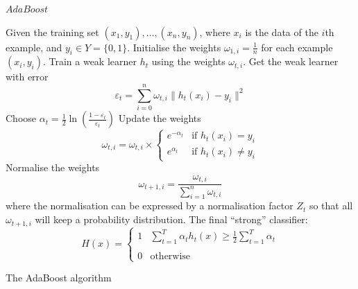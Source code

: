 \begin{table}
$AdaBoost$
\begin{algorithmic}[1]
\STATE Given the training set $(x_{1},y_{1}),\ldots,(x_{n},y_{n})$, where $x_{i}$ is the data of the $i$th example, and $y_{i} \in Y=\{0,1\}$.
\STATE Initialise the weights $\omega_{1,i}=\frac{1}{n}$ for each example $(x_{i},y_{i})$.
	\STATE Train a weak learner $h_{t}$ using the weights $\omega_{t,i}$.
	\STATE Get the weak learner with error 
                       \begin{equation}\label{eq:error}
                        \varepsilon_{t} =\sum_{i=0}^{n}\omega_{t,i}\|h_{t}(x_{i})-y_{i}\|^2
                       \end{equation}
	\STATE Choose $\alpha_{t}=\frac{1}{2}\ln \left( \frac{1-\varepsilon_{t}}{\varepsilon_{t}} \right)$
	\STATE Update the weights 
		\begin{equation}\label{eq:update}
		 \omega_{t,i} = \omega_{t,i} \times
                 \left\{
		  \begin{array}{ll}
		                                            e^{-\alpha_{t}} & \textrm{if $h_{t}(x_{i})=y_{i}$} \\
						           e^{\alpha_{t}} & \textrm{if $h_{t}(x_{i}) \neq y_{i}$}
		  \end{array}
		\right.
		\end{equation}
	\STATE Normalise the weights 
		\begin{equation}\label{eq:normalisation}
		  \omega_{t+1,i} = \frac{\omega_{t,i}}{\sum_{i=1}^{n}\omega_{t,i}}
		\end{equation}
	where the normalisation can be expressed by a normalisation factor $Z_{t}$ so that all $ \omega_{t+1,i}$ will keep a probability distribution.
\ENDFOR
\STATE The final ``strong'' classifier:
	\begin{equation}
	 H(x)  = 
		\left\{
		 \begin{array}{ll}
		  1 & \sum_{t=1}^{T}\alpha_{t}h_{t}(x) \geq \frac{1}{2}\sum_{t=1}^{T}\alpha_{t}\\
			\\
		  0 & \textrm{otherwise}
		 \end{array}
		\right. 
	\end{equation}
\end{algorithmic}
\caption{The AdaBoost algorithm}
\label{tab:adaboost}
\end{table} 

